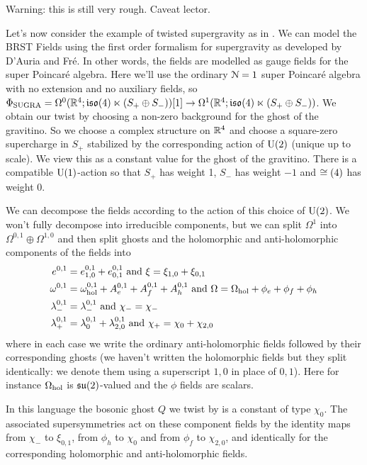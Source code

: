 \documentclass[10pt, oneside]{article}
\begin{document}
\begin{example}[4d $\mc N=1$ supergravity]
Warning: this is still very rough.  Caveat lector.

Let's now consider the example of twisted supergravity as in \cite{BaulieuBellonReys}.  We can model the BRST Fields using the first order formalism for supergravity as developed by D'Auria and Fr\'e.  In other words, the fields are modelled as gauge fields for the super Poincar\'e algebra.  Here we'll use the ordinary $\mc N=1$ super Poincar\'e algebra with no extension and no auxiliary fields, so $\Phi_{\mathrm{SUGRA}} = \Omega^0(\mathbb{R}^4; \mathfrak{iso}(4) \ltimes (S_+ \oplus S_-))[1] \to \Omega^1(\mathbb{R}^4; \mathfrak{iso}(4) \ltimes (S_+ \oplus S_-))$.  We obtain our twist by choosing a non-zero background for the ghost of the gravitino. So we choose a complex structure on $\mathbb{R}^4$ and choose a square-zero supercharge in $S_+$ stabilized by the corresponding action of $\mathrm{U}(2)$ (unique up to scale).  We view this as a constant value for the ghost of the gravitino.  There is a compatible $\mathrm{U}(1)$-action so that $S_+$ has weight 1, $S_-$ has weight $-1$ and $\cong(4)$ has weight 0.

We can decompose the fields according to the action of this choice of $\mathrm{U}(2)$.  We won't fully decompose into irreducible components, but we can split $\Omega^1$ into $\Omega^{0,1} \oplus \Omega^{1,0}$ and then split ghosts and the holomorphic and anti-holomorphic components of the fields into 
\begin{align*}
e^{0,1} &= e^{0,1}_{1,0} + e^{0,1}_{0,1} \text{ and } \xi = \xi_{1,0} + \xi_{0,1} \\
\omega^{0,1} &= \omega^{0,1}_{\mathrm{hol}} + A^{0,1}_e + A^{0,1}_f + A^{0,1}_h \text{ and } \Omega = \Omega_{\mathrm{hol}} + \phi_e + \phi_f + \phi_h\\
\lambda^{0,1}_- &= \lambda^{0,1}_- \text{ and } \chi_- = \chi_- \\
\lambda^{0,1}_+ &= \lambda^{0,1}_0 + \lambda^{0,1}_{2,0} \text{ and } \chi_+ = \chi_0 + \chi_{2,0}
\end{align*}
where in each case we write the ordinary anti-holomorphic fields followed by their corresponding ghosts (we haven't written the holomorphic fields but they split identically: we denote them using a superscript $1,0$ in place of $0,1$).  Here for instance $\Omega_{\mathrm{hol}}$ is $\mathfrak{su}(2)$-valued and the $\phi$ fields are scalars.

In this language the bosonic ghost $Q$ we twist by is a constant of type $\chi_0$.  The associated supersymmetries act on these component fields by the identity maps from $\chi_-$ to $\xi_{0,1}$, from $\phi_h$ to $\chi_0$ and from $\phi_f$ to $\chi_{2,0}$, and identically for the corresponding holomorphic and anti-holomorphic fields.


\end{example}
\end{document}
